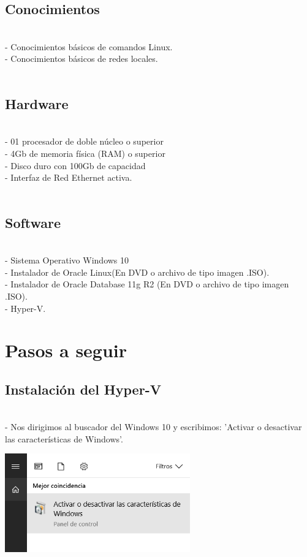 \documentclass[12pt,letterpaper]{article}
\begin{document}
\begin{itemize}
\subsection{Conocimientos}\\
- Conocimientos básicos de comandos Linux.\\
- Conocimientos básicos de redes locales.\\\\

\subsection{Hardware}\\
- 01 procesador de doble núcleo o superior\\
- 4Gb de memoria física (RAM) o superior\\
- Disco duro con 100Gb de capacidad\\
- Interfaz de Red Ethernet activa.\\\\

\subsection{Software}\\
- Sistema Operativo Windows 10\\
- Instalador de Oracle Linux(En DVD o archivo de tipo imagen .ISO).\\
- Instalador de Oracle Database 11g R2 (En DVD o archivo de tipo imagen .ISO).\\
- Hyper-V.
\end{itemize} 


\section{Pasos a seguir}

\begin{itemize}
\subsection{Instalación del Hyper-V}\\
- Nos dirigimos al buscador del Windows 10 y escribimos: 'Activar o desactivar las características de Windows'.\\
\end{itemize}

\begin{center}
	\includegraphics[width=8cm]{./Imagenes/1} 
\end{center}
\end{document}
